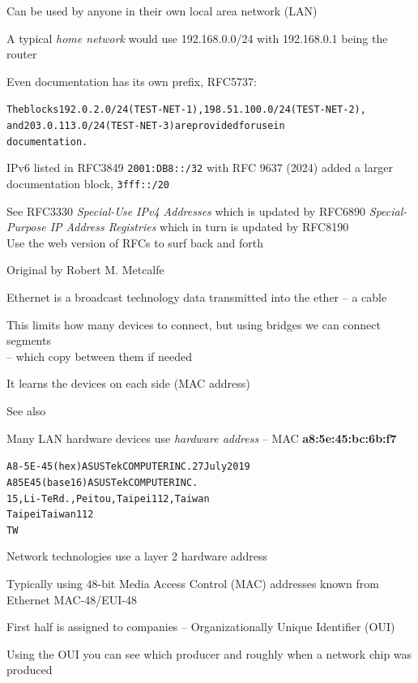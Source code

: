 \documentclass[Screen16to9,17pt]{foils}
\begin{document}
Can be used by anyone in their own local area network (LAN)

A typical \emph{home network} would use 192.168.0.0/24 with 192.168.0.1 being the router



Even documentation has its own prefix, RFC5737:
\begin{alltt}
The blocks 192.0.2.0/24 (TEST-NET-1), 198.51.100.0/24 (TEST-NET-2),
and 203.0.113.0/24 (TEST-NET-3) are provided for use in
documentation.
\end{alltt}

IPv6 listed in RFC3849 \verb+2001:DB8::/32+
with RFC 9637 (2024) added a larger documentation block, \verb+3fff::/20+



See RFC3330 \emph{Special-Use IPv4 Addresses} which is updated by
RFC6890 \emph{Special-Purpose IP Address Registries} which in turn is updated by RFC8190\\
Use the web version of RFCs to surf back and forth 




Original by Robert M. Metcalfe

\begin{list2}
\item Ethernet is a broadcast technology data transmitted into the ether -- a cable
\item This limits how many devices to connect, but using bridges we can connect segments\\
 -- which copy between them if needed
\item It learns the devices on each side (MAC address)
\item See also 
\end{list2}



Many LAN hardware devices use \emph{hardware address} -- MAC \textbf{a8:5e:45:bc:6b:f7}

\begin{alltt}
A8-5E-45   (hex)		ASUSTek COMPUTER INC. 27 July 2019
A85E45     (base 16)		ASUSTek COMPUTER INC.
				15,Li-Te Rd., Peitou, Taipei 112, Taiwan
				Taipei  Taiwan  112
				TW
\end{alltt}
\begin{list2}
\item Network technologies use a layer 2 hardware address
\item Typically using 48-bit Media Access Control (MAC) addresses known from Ethernet MAC-48/EUI-48
\item First half is assigned to companies -- Organizationally Unique Identifier (OUI)
\item Using the OUI you can see which producer and roughly when a network chip was produced
\item {}
\end{list2}
\end{document}
